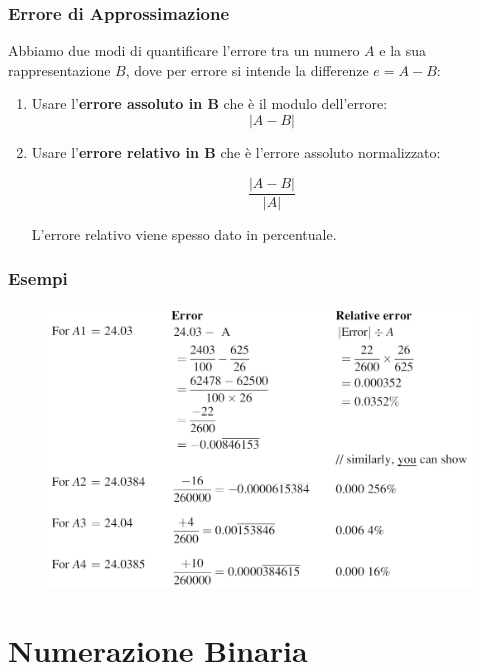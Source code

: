 \documentclass[xcolor={table}]{beamer}
\begin{document}
\begin{frame}
   \frametitle{Errore di Approssimazione}
   
   Abbiamo due modi di quantificare l'errore tra un numero $A$ e la sua rappresentazione $B$, 
   dove per errore si intende la differenze $e= A - B$:
   
   \begin{enumerate}
   \item Usare l'{\bf errore assoluto in B} che è il modulo dell'errore: 
   $$|A - B|$$
   \pause
   \bigskip
   \item Usare l'{\bf errore relativo in B} che è l'errore assoluto normalizzato: 
   
   $$\frac{|A - B|}{|A|}$$ 
   
   L'errore relativo viene spesso dato in percentuale.
   \end{enumerate}

   
\end{frame}

\begin{frame}
   \frametitle{Esempi}

   	\begin{figure}[h]
	\begin{center}
	\includegraphics[width=\textwidth]{img/binary2.PNG}
	\end{center}
	\end{figure}
	
\end{frame}

\section {Numerazione Binaria}
\end{document}
